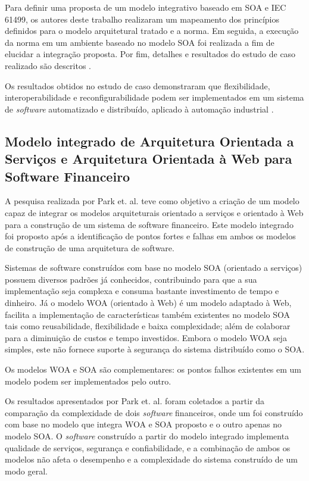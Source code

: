 Para definir uma proposta de um modelo integrativo baseado em SOA e IEC 61499, os autores deste trabalho realizaram um mapeamento dos princípios definidos para o modelo arquitetural tratado e a norma. Em seguida, a execução da norma em um ambiente baseado no modelo SOA foi realizada a fim de elucidar a integração proposta. Por fim, detalhes e resultados do estudo de caso realizado são descritos \cite{dai_bridging_2015}.

Os resultados obtidos no estudo de caso demonstraram que flexibilidade, interoperabilidade e reconfigurabilidade podem ser implementados em um sistema de \textit{software} automatizado e distribuído, aplicado à automação industrial \cite{dai_bridging_2015}.


\subsection{Modelo integrado de Arquitetura Orientada a Serviços e Arquitetura Orientada à Web para Software Financeiro}
A pesquisa realizada por Park et. al. \cite{park_integrated_2012} teve como objetivo a criação de um modelo capaz de integrar os modelos arquiteturais orientado a serviços e orientado à Web para a construção de um sistema de software financeiro. Este modelo integrado foi proposto após a identificação de pontos fortes e falhas em ambos os modelos de construção de uma arquitetura de software.

Sistemas de software construídos com base no modelo SOA (orientado a serviços) possuem diversos padrões já conhecidos, contribuindo para que a sua implementação seja complexa e consuma bastante investimento de tempo e dinheiro. Já o modelo WOA (orientado à Web) é um modelo adaptado à Web, facilita a implementação de características também existentes no modelo SOA tais como reusabilidade, flexibilidade e baixa complexidade; além de colaborar para a diminuição de custos e tempo investidos. Embora o modelo WOA seja simples, este não fornece suporte à segurança do sistema distribuído como o SOA.

Os modelos WOA e SOA são complementares: os pontos falhos existentes em um modelo podem ser implementados pelo outro.

Os resultados apresentados por Park et. al. \cite{park_integrated_2012} foram coletados a partir da comparação da complexidade de dois \textit{software} financeiros, onde um foi construído com base no modelo que integra WOA e SOA proposto e o outro apenas no modelo SOA. O \textit{software} construído a partir do modelo integrado implementa qualidade de serviços, segurança e confiabilidade, e a combinação de ambos os modelos não afeta o desempenho e a complexidade do sistema construído de um modo geral.


